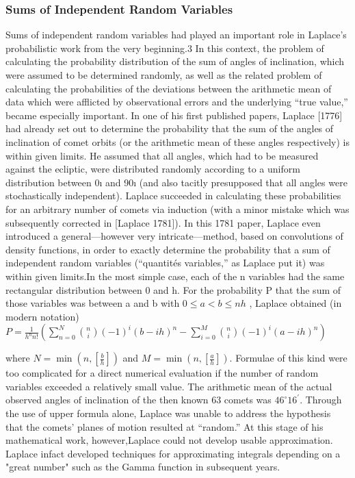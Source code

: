 \documentclass{article}
\begin{document}
\subsubsection{Sums of Independent Random Variables}
Sums of independent random variables had played an important role in Laplace’s
probabilistic work from the very beginning.3 In this context, the problem of calculating the probability distribution of the sum of angles of inclination, which were
assumed to be determined randomly, as well as the related problem of calculating
the probabilities of the deviations between the arithmetic mean of data which were
afflicted by observational errors and the underlying “true value,” became especially
important. In one of his first published papers, Laplace [1776] had already set out to
determine the probability that the sum of the angles of inclination of comet orbits (or
the arithmetic mean of these angles respectively) is within given limits. He assumed
that all angles, which had to be measured against the ecliptic, were distributed randomly according to a uniform distribution between 0ı and 90ı (and also tacitly
presupposed that all angles were stochastically independent). Laplace succeeded in
calculating these probabilities for an arbitrary number of comets via induction (with
a minor mistake which was subsequently corrected in [Laplace 1781]). In this 1781
paper, Laplace even introduced a general—however very intricate—method, based
on convolutions of density functions, in order to exactly determine the probability
that a sum of independent random variables (“quantités variables,” as Laplace put it)
was within given limits.In the most simple case, each of the n variables had the
same rectangular distribution between 0 and h. For the probability P that the sum
of those variables was between a and b with $ 0 \leq a< b \leq nh $ , Laplace obtained (in
modern notation)
$ P= \frac{1}{h^{n}n!}(\sum\limits_{n=0}^{N}\binom{n}{i}(-1)^{i}(b-ih)^{n}- \sum\limits_{i=0}^{M}\binom{n}{i}(-1)^{i}(a-ih)^{n}  ) $

where $ N= \min(n,[\frac{b}{h}]) $ and $ M= \min(n,[\frac{a}{h}])$.
Formulae of this kind were too complicated for a direct numerical evaluation if the number of random variables exceeded a relatively small value. The arithmetic mean of the actual observed angles of inclination of the then known 63 comets was $46^{\circ} 16^{\prime} $. Through the use of upper formula  alone, Laplace was unable to address the hypothesis that the comets’ planes of motion resulted at “random.” At this stage of his mathematical work, however,Laplace could not develop usable approximation.
Laplace infact developed techniques for approximating integrals depending on a "great number" such as the Gamma function in subsequent years.
\end{document}
